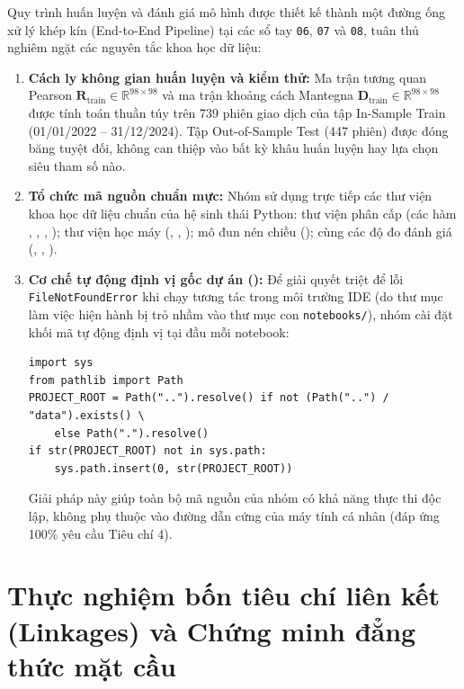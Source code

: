 \documentclass[12pt,a4paper,oneside,openany]{report}
\begin{document}
Quy trình huấn luyện và đánh giá mô hình được thiết kế thành một đường ống xử lý khép kín (End-to-End Pipeline) tại các sổ tay \texttt{06}, \texttt{07} và \texttt{08}, tuân thủ nghiêm ngặt các nguyên tắc khoa học dữ liệu:
\begin{enumerate}
  \item \textbf{Cách ly không gian huấn luyện và kiểm thử:} Ma trận tương quan Pearson $\mathbf{R}_{\text{train}} \in \mathbb{R}^{98 \times 98}$ và ma trận khoảng cách Mantegna $\mathbf{D}_{\text{train}} \in \mathbb{R}^{98 \times 98}$ được tính toán thuần túy trên 739 phiên giao dịch của tập In-Sample Train (01/01/2022 -- 31/12/2024). Tập Out-of-Sample Test (447 phiên) được đóng băng tuyệt đối, không can thiệp vào bất kỳ khâu huấn luyện hay lựa chọn siêu tham số nào.
  \item \textbf{Tổ chức mã nguồn chuẩn mực:} Nhóm sử dụng trực tiếp các thư viện khoa học dữ liệu chuẩn của hệ sinh thái Python: thư viện phân cấp  (các hàm , , , ); thư viện học máy  (, , ); mô đun nén chiều  (); cùng các độ đo đánh giá  (, , ).
  \item \textbf{Cơ chế tự động định vị gốc dự án ():} Để giải quyết triệt để lỗi \texttt{FileNotFoundError} khi chạy tương tác trong môi trường IDE (do thư mục làm việc hiện hành bị trỏ nhầm vào thư mục con \texttt{notebooks/}), nhóm cài đặt khối mã tự động định vị tại đầu mỗi notebook:
\begin{lstlisting}
import sys
from pathlib import Path
PROJECT_ROOT = Path("..").resolve() if not (Path("..") / "data").exists() \
    else Path(".").resolve()
if str(PROJECT_ROOT) not in sys.path:
    sys.path.insert(0, str(PROJECT_ROOT))
\end{lstlisting}
Giải pháp này giúp toàn bộ mã nguồn của nhóm có khả năng thực thi độc lập, không phụ thuộc vào đường dẫn cứng của máy tính cá nhân (đáp ứng 100\% yêu cầu Tiêu chí 4).
\end{enumerate}

\section{Thực nghiệm bốn tiêu chí liên kết (Linkages) và Chứng minh đẳng thức mặt cầu}
\label{sec:linkage_comparison}
\end{document}
